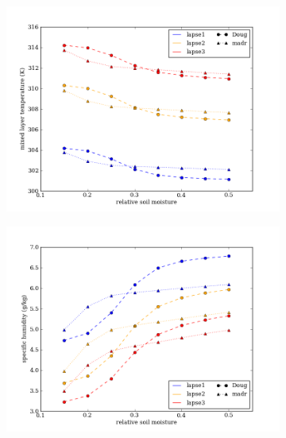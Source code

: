 \begin{figure}[here]
\begin{subfigure}{0.5\textwidth}
\includegraphics[width=\textwidth]{ch2-BL/figures/all_afternoon_T.png}
\caption{}
\end{subfigure}
\begin{subfigure}{0.5\textwidth}
\includegraphics[width=\textwidth]{ch2-BL/figures/all_afternoon_Q.png}
\caption{}
\end{subfigure}
\caption{}
\label{fig:BL_345changes}
\end{figure}


